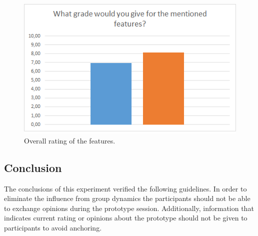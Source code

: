 \documentclass[Main.tex]{subfiles}
\begin{document}
\begin{figure}
\includegraphics[width=\textwidth]{FinalGrade.png}
\caption{Overall rating of the features.}
\label{fig:final}
\end{figure}

\subsection{Conclusion}
The conclusions of this experiment verified the following guidelines. In order to eliminate the influence from group dynamics the participants should not be able to exchange opinions during the prototype session. Additionally, information that indicates current rating or opinions about the prototype should not be given to participants to avoid anchoring.

\end{document}
